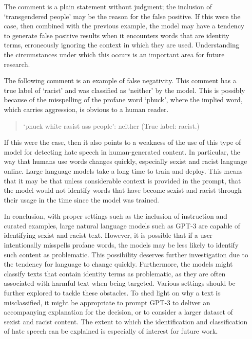 \documentclass[12pt,]{article}
\begin{document}
The comment is a plain statement without judgment; the inclusion of `transgendered people' may be the reason for the false positive. If this were the case, then combined with the previous example, the model may have a tendency to generate false positive results when it encounters words that are identity terms, erroneously ignoring the context in which they are used. Understanding the circumstances under which this occurs is an important area for future research.

The following comment is an example of false negativity. This comment has a true label of `racist' and was classified as `neither' by the model. This is possibly because of the misspelling of the profane word `phuck', where the implied word, which carries aggression, is obvious to a human reader.

\begin{quote}
`phuck white rasist ass people': neither (True label: racist.)
\end{quote}

If this were the case, then it also points to a weakness of the use of this type of model for detecting hate speech in human-generated content. In particular, the way that humans use words changes quickly, especially sexist and racist language online. Large language models take a long time to train and deploy. This means that it may be that unless considerable context is provided in the prompt, that the model would not identify words that have become sexist and racist through their usage in the time since the model was trained.

In conclusion, with proper settings such as the inclusion of instruction and curated examples, large natural language models such as GPT-3 are capable of identifying sexist and racist text. However, it is possible that if a user intentionally misspells profane words, the models may be less likely to identify such content as problematic. This possibility deserves further investigation due to the tendency for language to change quickly. Furthermore, the models might classify texts that contain identity terms as problematic, as they are often associated with harmful text when being targeted. Various settings should be further explored to tackle these obstacles. To shed light on why a text is misclassified, it might be appropriate to prompt GPT-3 to deliver an accompanying explanation for the decision, or to consider a larger dataset of sexist and racist content. The extent to which the identification and classification of hate speech can be explained is especially of interest for future work.
\end{document}
